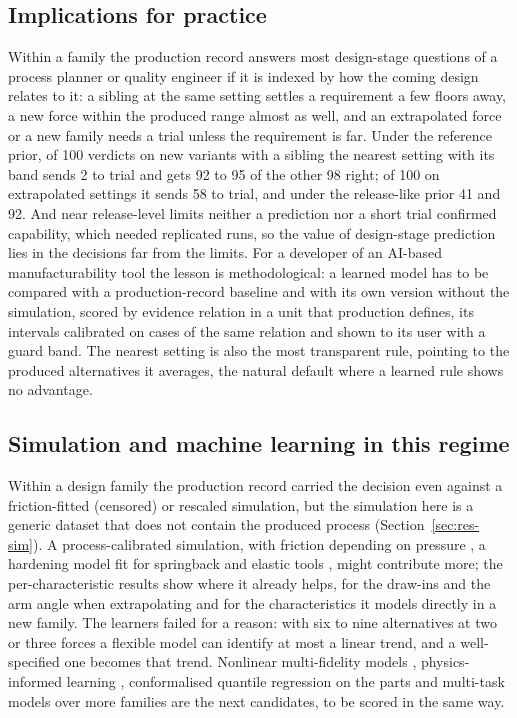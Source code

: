 \documentclass[pdflatex,sn-basic,lineno]{sn-jnl}
\begin{document}
\subsection{Implications for practice}

Within a family the production record answers most design-stage questions of a process planner or quality engineer if it is indexed by how the coming design relates to it: a sibling at the same setting settles a requirement a few floors away, a new force within the produced range almost as well, and an extrapolated force or a new family needs a trial unless the requirement is far. Under the reference prior, of 100 verdicts on new variants with a sibling the nearest setting with its band sends 2 to trial and gets 92 to 95 of the other 98 right; of 100 on extrapolated settings it sends 58 to trial, and under the release-like prior 41 and 92. And near release-level limits neither a prediction nor a short trial confirmed capability, which needed replicated runs, so the value of design-stage prediction lies in the decisions far from the limits. For a developer of an AI-based manufacturability tool the lesson is methodological: a learned model has to be compared with a production-record baseline and with its own version without the simulation, scored by evidence relation in a unit that production defines, its intervals calibrated on cases of the same relation and shown to its user with a guard band. The nearest setting is also the most transparent rule, pointing to the produced alternatives it averages, the natural default where a learned rule shows no advantage.

\subsection{Simulation and machine learning in this regime}

Within a design family the production record carried the decision even against a friction-fitted (censored) or rescaled simulation, but the simulation here is a generic dataset that does not contain the produced process (Section~\ref{sec:res-sim}). A process-calibrated simulation, with friction depending on pressure \citep{hol2012advanced}, a hardening model fit for springback \citep{wagoner2013advanced} and elastic tools \citep{pilthammar2018introduction}, might contribute more; the per-characteristic results show where it already helps, for the draw-ins and the arm angle when extrapolating and for the characteristics it models directly in a new family. The learners failed for a reason: with six to nine alternatives at two or three forces a flexible model can identify at most a linear trend, and a well-specified one becomes that trend. Nonlinear multi-fidelity models \citep{perdikaris2017nonlinear}, physics-informed learning \citep{karniadakis2021physics}, conformalised quantile regression on the parts \citep{romano2019conformalized} and multi-task models over more families \citep{bonilla2008multi} are the next candidates, to be scored in the same way.
\end{document}
